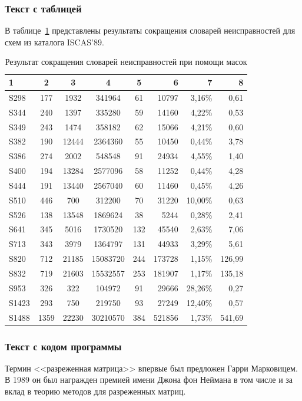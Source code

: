 \documentclass[bachelor, och, coursework]{SCWorks}
\begin{document}
\subsubsection{Текст с таблицей}
В таблице~\ref{table-1} представлены результаты сокращения словарей неисправностей для схем из каталога ISCAS'89.

\begin{table}[!ht]
	\small
	\caption{Результат сокращения словарей неисправностей при помощи масок} \label{table-1}
	\begin{tabular}{|l|c|c|c|c|r|r|r|}
		\hline 1 & 2& 3& 4& 5& 6& 7& 8\\
		\hline S298 & 177 & 1932 & 341964 & 61 & 10797 & 3,16\% & 0,61\\
		\hline S344 & 240 & 1397 & 335280 & 59 & 14160 & 4,22\% & 0,53\\
		\hline S349 & 243 & 1474 & 358182 & 62 & 15066 & 4,21\% & 0,60\\
		\hline S382 & 190 & 12444 & 2364360 & 55 & 10450 & 0,44\% & 3,78\\
		\hline S386 & 274 & 2002 & 548548 & 91 & 24934 & 4,55\% & 1,40\\
		\hline S400 & 194 & 13284 & 2577096 & 58 & 11252 & 0,44\% & 4,28\\
		\hline S444 & 191 & 13440 & 2567040 & 60 & 11460 & 0,45\% & 4,26\\
		\hline S510 & 446 & 700 & 312200 & 70 & 31220 & 10,00\% & 0,63\\
		\hline S526 & 138 & 13548 & 1869624 & 38 & 5244 & 0,28\% & 2,41\\
		\hline S641 & 345 & 5016 & 1730520 & 132 & 45540 & 2,63\% & 7,06\\
		\hline S713 & 343 & 3979 & 1364797 & 131 & 44933 & 3,29\% & 5,61\\
		\hline S820 & 712 & 21185 & 15083720 & 244 & 173728 & 1,15\% & 126,99\\
		\hline S832 & 719 & 21603 & 15532557 & 253 & 181907 & 1,17\% & 135,18\\
		\hline S953 & 326 & 322 & 104972 & 91 & 29666 & 28,26\% & 0,27\\
		\hline S1423 & 293 & 750 & 219750 & 93 & 27249 & 12,40\% & 0,57\\
		\hline S1488 & 1359 & 22230 & 30210570 & 384 & 521856 & 1,73\% & 541,69\\
		\hline
	\end{tabular}
\end{table}

\subsubsection{Текст с кодом программы}
Термин <<разреженная матрица>> впервые был предложен Гарри Марковицем. В 1989 он был награжден премией имени Джона фон Неймана в том числе и за вклад в теорию методов для разреженных матриц.
\end{document}
